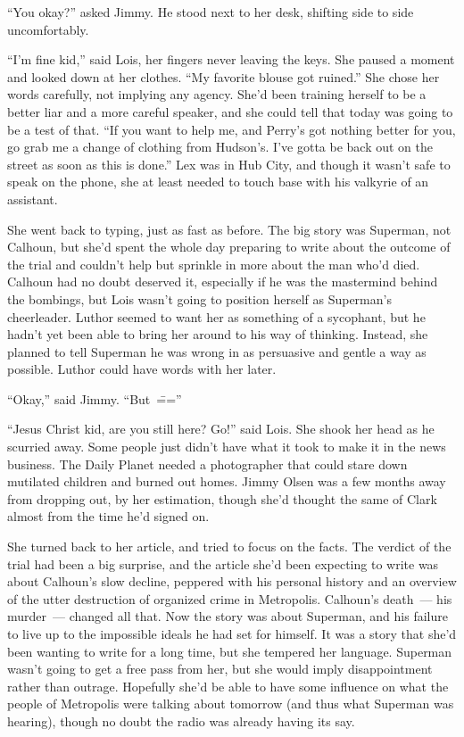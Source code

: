 \documentclass[ebook,12pt]{memoir}
\begin{document}
``You okay?'' asked Jimmy. He stood next to her desk, shifting side to
side uncomfortably.

``I'm fine kid,'' said Lois, her fingers never leaving the keys. She
paused a moment and looked down at her clothes. ``My favorite blouse got
ruined.'' She chose her words carefully, not implying any agency. She'd
been training herself to be a better liar and a more careful speaker,
and she could tell that today was going to be a test of that. ``If you
want to help me, and Perry's got nothing better for you, go grab me a
change of clothing from Hudson's. I've gotta be back out on the street
as soon as this is done.'' Lex was in Hub City, and though it wasn't
safe to speak on the phone, she at least needed to touch base with his
valkyrie of an assistant.

She went back to typing, just as fast as before. The big story was
Superman, not Calhoun, but she'd spent the whole day preparing to write
about the outcome of the trial and couldn't help but sprinkle in more
about the man who'd died. Calhoun had no doubt deserved it, especially
if he was the mastermind behind the bombings, but Lois wasn't going to
position herself as Superman's cheerleader. Luthor seemed to want her as
something of a sycophant, but he hadn't yet been able to bring her
around to his way of thinking. Instead, she planned to tell Superman he
was wrong in as persuasive and gentle a way as possible. Luthor could
have words with her later.

``Okay,'' said Jimmy. ``But~\===''

``Jesus Christ kid, are you still here? Go!'' said Lois. She shook her
head as he scurried away. Some people just didn't have what it took to
make it in the news business. The Daily Planet needed a photographer
that could stare down mutilated children and burned out homes. Jimmy
Olsen was a few months away from dropping out, by her estimation, though
she'd thought the same of Clark almost from the time he'd signed on.

She turned back to her article, and tried to focus on the facts. The
verdict of the trial had been a big surprise, and the article she'd been
expecting to write was about Calhoun's slow decline, peppered with his
personal history and an overview of the utter destruction of organized
crime in Metropolis. Calhoun's death~--- his murder~--- changed all
that. Now the story was about Superman, and his failure to live up to
the impossible ideals he had set for himself. It was a story that she'd
been wanting to write for a long time, but she tempered her language.
Superman wasn't going to get a free pass from her, but she would imply
disappointment rather than outrage. Hopefully she'd be able to have some
influence on what the people of Metropolis were talking about tomorrow
(and thus what Superman was hearing), though no doubt the radio was
already having its say.
\end{document}
